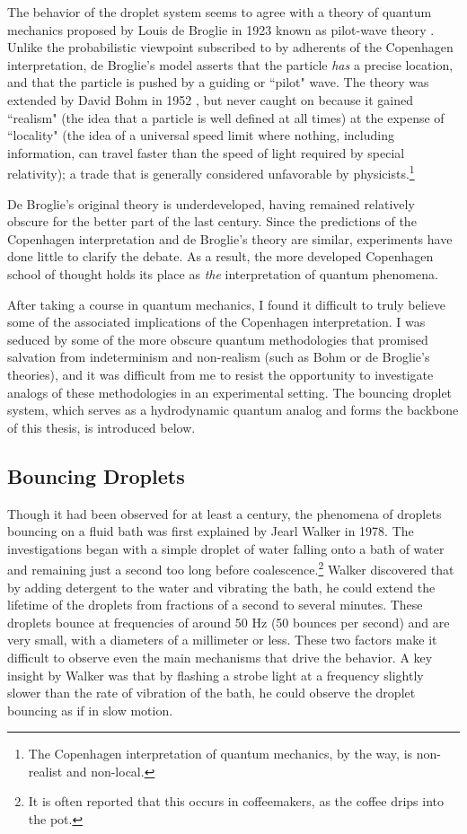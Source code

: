     The behavior of the droplet system seems to agree with a theory of quantum mechanics proposed by Louis de Broglie in 1923 known as pilot-wave theory . Unlike the probabilistic viewpoint subscribed to by adherents of the Copenhagen interpretation, de Broglie's model asserts that the particle \textit{has} a precise location, and that the particle is pushed by a guiding or ``pilot" wave. The theory was extended by David Bohm in 1952 , but never caught on because it gained ``realism" (the idea that a particle is well defined at all times) at the expense of ``locality" (the idea of a universal speed limit where nothing, including information, can travel faster than the speed of light required by special relativity); a trade that is generally considered unfavorable by physicists.\footnote{The Copenhagen interpretation of quantum mechanics, by the way, is non-realist and non-local.} 
    
    De Broglie's original theory is underdeveloped, having remained relatively obscure for the better part of the last century. Since the predictions of the Copenhagen interpretation and de Broglie's theory are similar, experiments have done little to clarify the debate. As a result, the more developed Copenhagen school of thought holds its place as \textit{the} interpretation of quantum phenomena. 
    
     After taking a course in quantum mechanics, I found it difficult to truly believe some of the associated implications of the Copenhagen interpretation. I was seduced by some of the more obscure quantum methodologies that promised salvation from indeterminism and non-realism (such as Bohm or de Broglie's theories), and it was difficult from me to resist the opportunity to investigate analogs of these methodologies in an experimental setting. The bouncing droplet system, which serves as a hydrodynamic quantum analog and forms the backbone of this thesis, is introduced below. 
    
	    \subsection*{Bouncing Droplets}
	    Though it had been observed for at least a century, the phenomena of droplets bouncing on a fluid bath was first explained by Jearl Walker in 1978. The investigations began with a simple droplet of water falling onto a bath of water and remaining just a second too long before coalescence.\footnote{It is often reported that this occurs in coffeemakers, as the coffee drips into the pot.} Walker discovered that by adding detergent to the water and vibrating the bath, he could extend the lifetime of the droplets from fractions of a second to several minutes. These droplets bounce at frequencies of around 50 Hz (50 bounces per second) and are very small, with a diameters of a millimeter or less. These two factors make it difficult to observe even the main mechanisms that drive the behavior. A key insight by Walker was that by flashing a strobe light at a frequency slightly slower than the rate of vibration of the bath, he could observe the droplet bouncing as if in slow motion.
	    
